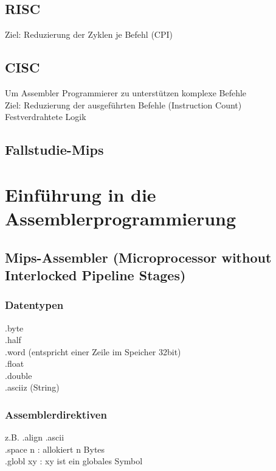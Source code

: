 \documentclass[a4paper]{scrartcl}
\begin{document}
		
		\subsection{RISC}
		Ziel: Reduzierung der Zyklen je Befehl (CPI)\\ 
		
		\subsection{CISC}
		Um Assembler Programmierer zu unterstützen komplexe Befehle\\
		Ziel: Reduzierung der ausgeführten Befehle (Instruction Count)\\ 
		Festverdrahtete Logik\\
		
		\subsection{Fallstudie-Mips}
		
	\section{Einführung in die Assemblerprogrammierung}
		\subsection{Mips-Assembler (Microprocessor without Interlocked Pipeline Stages)}
			\subsubsection{Datentypen}
			.byte\\
			.half\\
			.word (entspricht einer Zeile im Speicher 32bit)\\ 
			.float\\
			.double\\
			.asciiz (String)\\
			
			
			\subsubsection{Assemblerdirektiven} 
			z.B. .align .ascii\\
			
			.space n : allokiert n Bytes\\
			.globl xy : xy ist ein globales Symbol\\
			
\end{document}

